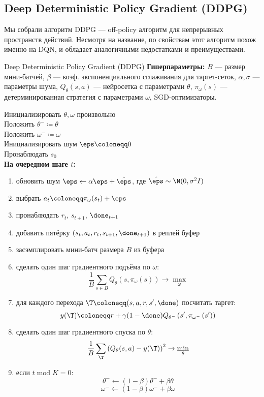 \subsection{Deep Deterministic Policy Gradient (DDPG)}

Мы собрали алгоритм DDPG --- off-policy алгоритм для непрерывных пространств действий. Несмотря на название, по свойствам этот алгоритм похож именно на DQN, и обладает аналогичными недостатками и преимуществами.

\begin{algorithm}[label = DDPGalgorithm]{Deep Deterministic Policy Gradient (DDPG)}
\textbf{Гиперпараметры:} $B$ --- размер мини-батчей, $\beta$ --- коэф. экспоненциального сглаживания для таргет-сеток, $\alpha, \sigma$ --- параметры шума, $Q_{\theta}(s, a)$ --- нейросетка с параметрами $\theta$, $\pi_{\omega}(s)$ --- детерминированная стратегия с параметрами $\omega$, SGD-оптимизаторы.

\vspace{0.3cm}
Инициализировать $\theta, \omega$ произвольно \\
Положить $\theta^- \coloneqq \theta$ \\
Положить $\omega^- \coloneqq \omega$ \\
Инициализировать шум $\eps \coloneqq 0$ \\
Пронаблюдать $s_0$ \\
\textbf{На очередном шаге $t$:}
\begin{enumerate}
    \item обновить шум $\eps \leftarrow \alpha \eps + \hat{\eps}$, где $\hat{\eps} \sim \N(0, \sigma^2 I)$
    \item выбрать $a_t \coloneqq \pi_\omega(s_t) + \eps$
    \item пронаблюдать $r_t$,  $s_{t+1}$, $\done_{t+1}$
    \item добавить пятёрку $(s_t, a_t, r_t, s_{t+1}, \done_{t+1})$ в реплей буфер
    \item засэмплировать мини-батч размера $B$ из буфера
    \item сделать один шаг градиентного подъёма по $\omega$:
    $$\frac{1}{B}\sum_{s \in B} Q_{\theta}(s, \pi_\omega(s)) \to \max_{\omega}$$
    \item для каждого перехода $\T \coloneqq (s, a, r, s', \done)$ посчитать таргет:
    $$y(\T ) \coloneqq r + \gamma (1 - \done) Q_{\theta^{-}} \left( s', \pi_{\omega^{-}} \left( s' \right) \right)$$
    \item сделать один шаг градиентного спуска по $\theta$:
    $$\frac{1}{B}\sum_{\T} \left( Q_{\theta}(s, a) - y(\T ) \right) ^2 \to \min_\theta$$
    \item если $t \operatorname{mod} K = 0$: 
        $$\theta^{-} \gets (1 - \beta) \theta^{-} + \beta \theta$$
        $$\omega^{-} \gets (1 - \beta) \omega^{-} + \beta \omega$$
\end{enumerate}
\end{algorithm}

